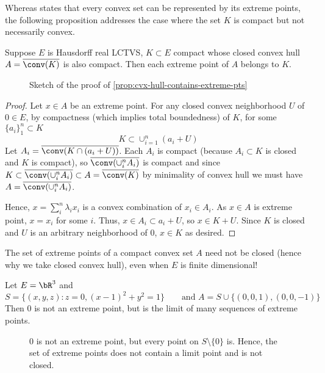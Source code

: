 Whereas  states that every convex set can be
represented by its extreme points, the following proposition addresses
the case where the set $K$ is compact but not necessarily convex.

\begin{proposition}
  \label{prop:cvx-hull-contains-extreme-pts}
  Suppose $E$ is Hausdorff real LCTVS, $K \subset E$ compact whose closed
  convex hull $A = \overline{\conv(K)}$ is also compact.
  Then each extreme point of $A$ belongs to $K$.
\end{proposition}

\begin{figure}[ht]
    \centering
    \caption{Sketch of the proof of \cref{prop:cvx-hull-contains-extreme-pts}}
    \label{fig:cvx-hull-contains-extreme-pts}
\end{figure}

\begin{proof}
  Let $x \in A$ be an extreme point.
  For any closed convex neighborhood $U$ of $0 \in E$,
  by compactness (which implies total boundedness) of $K$,
  for some $\{a_i\}_1^n \subset K$
  \[
    K \subset \cup_{i=1}^n (a_i + U)
  \]
  Let $A_i = \overline{\conv(K \cap (a_i + U))}$.
  Each $A_i$ is compact (because $A_i \subset K$ is closed and $K$ is compact),
  so $\overline{\conv(\cup_i^n A_i)}$ is compact and since
  $K \subset \overline{\conv(\cup_i^n A_i)} \subset A = \overline{\conv(K)}$
  by minimality of convex hull we must have $A = \overline{\conv(\cup_i^n A_i)}$.

  Hence, $x = \sum_i^n \lambda_i x_i$ is a convex combination of $x_i \in A_i$.
  As $x \in A$ is extreme point, $x = x_i$ for some $i$.
  Thus, $x \in A_i \subset a_i + U$,
  so $x \in K + U$.
  Since $K$ is closed and $U$ is an arbitrary neighborhood of $0$,
  $x \in K$ as desired.
\end{proof}

\begin{example}
  The set of extreme points of a compact convex set $A$
  need not be closed (hence why we take closed convex hull),
  even when $E$ is finite dimensional!

  Let $E = \bR^3$ and
  \[
    S = \{ (x,y,z) : z = 0, (x-1)^2 + y^2 = 1\}\qquad
    \text{and }
    A
    = S \cup \{(0,0,1), (0,0,-1)\}
  \]
  Then $0$ is not an extreme point, but is the limit of
  many sequences of extreme points.

  \begin{figure}[H]
    \centering
    \caption{$0$ is not an extreme point, but every point on
      $S \setminus \{0\}$ is. Hence, the set of extreme points
      does not contain a limit point and is not closed.
    }
  \end{figure}
\end{example}

